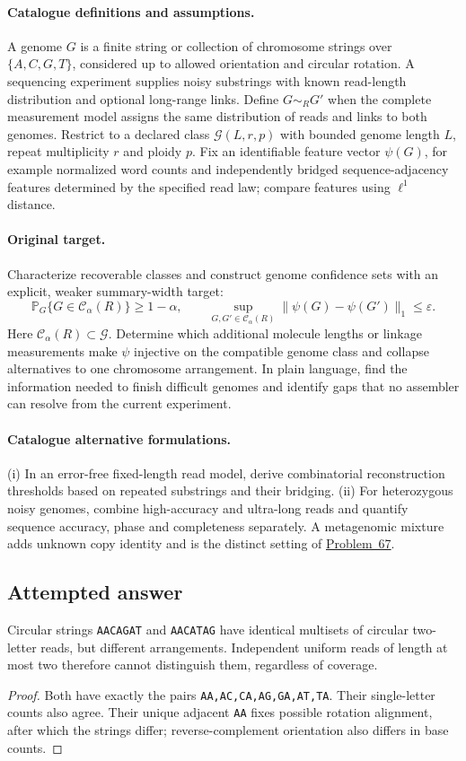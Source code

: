 \documentclass[11pt]{article}
\begin{document}
\paragraph{Catalogue definitions and assumptions.}
A genome $G$ is a finite string or collection of chromosome strings over $\{A,C,G,T\}$, considered up to allowed orientation and circular rotation. A sequencing experiment supplies noisy substrings with known read-length distribution and optional long-range links. Define $G\sim_R G'$ when the complete measurement model assigns the same distribution of reads and links to both genomes. Restrict to a declared class $\mathcal G(L,r,p)$ with bounded genome length $L$, repeat multiplicity $r$ and ploidy $p$. Fix an identifiable feature vector $\psi(G)$, for example normalized word counts and independently bridged sequence-adjacency features determined by the specified read law; compare features using $\ell^1$ distance.
\paragraph{Original target.}
Characterize recoverable classes and construct genome confidence sets with an explicit, weaker summary-width target:
\[\mathbb{P}_G\{G\in\mathcal C_\alpha(R)\}\ge1-\alpha,\qquad \sup_{G,G'\in\mathcal C_\alpha(R)}\|\psi(G)-\psi(G')\|_1\le\varepsilon.\]
Here $\mathcal C_\alpha(R)\subset\mathcal G$. Determine which additional molecule lengths or linkage measurements make $\psi$ injective on the compatible genome class and collapse alternatives to one chromosome arrangement. In plain language, find the information needed to finish difficult genomes and identify gaps that no assembler can resolve from the current experiment.
\paragraph{Catalogue alternative formulations.}
(i) In an error-free fixed-length read model, derive combinatorial reconstruction thresholds based on repeated substrings and their bridging. (ii) For heterozygous noisy genomes, combine high-accuracy and ultra-long reads and quantify sequence accuracy, phase and completeness separately. A metagenomic mixture adds unknown copy identity and is the distinct setting of \href{https://we-solve.github.io/problems/metagenome-reconstruction-cd5cc3b2/}{Problem~67}.
\subsection{Attempted answer}
\begin{proposition}
Circular strings \texttt{AACAGAT} and \texttt{AACATAG} have identical multisets of circular two-letter reads, but different arrangements. Independent uniform reads of length at most two therefore cannot distinguish them, regardless of coverage.
\end{proposition}
\begin{proof}
Both have exactly the pairs \texttt{AA,AC,CA,AG,GA,AT,TA}. Their single-letter counts also agree. Their unique adjacent \texttt{AA} fixes possible rotation alignment, after which the strings differ; reverse-complement orientation also differs in base counts.
\end{proof}
\end{document}

